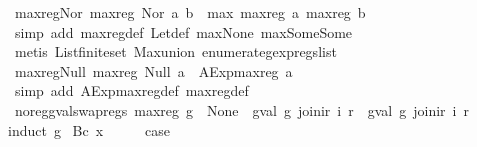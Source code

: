 \begin{isabellebody}
\isanewline
%
\endisadelimproof
\isanewline
{}\isamarkupfalse%
\ max{\isacharunderscore}reg{\isacharunderscore}Nor{\isacharcolon}\ {\isachardoublequoteopen}max{\isacharunderscore}reg\ {\isacharparenleft}Nor\ a\ b{\isacharparenright}\ {\isacharequal}\ max\ {\isacharparenleft}max{\isacharunderscore}reg\ a{\isacharparenright}\ {\isacharparenleft}max{\isacharunderscore}reg\ b{\isacharparenright}{\isachardoublequoteclose}\isanewline
%
\isadelimproof
\ \ %
\endisadelimproof
%
\isatagproof
{}\isamarkupfalse%
\ {\isacharparenleft}simp\ add{\isacharcolon}\ max{\isacharunderscore}reg{\isacharunderscore}def\ Let{\isacharunderscore}def\ max{\isacharunderscore}None\ max{\isacharunderscore}Some{\isacharunderscore}Some{\isacharparenright}\isanewline
\ \ \isamarkupfalse%
\ {\isacharparenleft}metis\ List{\isachardot}finite{\isacharunderscore}set\ Max{\isachardot}union\ enumerate{\isacharunderscore}gexp{\isacharunderscore}regs{\isacharunderscore}list{\isacharparenright}%
\endisatagproof
{\isafoldproof}%
%
\isadelimproof
\isanewline
%
\endisadelimproof
\isanewline
{}\isamarkupfalse%
\ max{\isacharunderscore}reg{\isacharunderscore}Null{\isacharcolon}\ {\isachardoublequoteopen}max{\isacharunderscore}reg\ {\isacharparenleft}Null\ a{\isacharparenright}\ {\isacharequal}\ AExp{\isachardot}max{\isacharunderscore}reg\ a{\isachardoublequoteclose}\isanewline
%
\isadelimproof
\ \ %
\endisadelimproof
%
\isatagproof
{}\isamarkupfalse%
\ {\isacharparenleft}simp\ add{\isacharcolon}\ AExp{\isachardot}max{\isacharunderscore}reg{\isacharunderscore}def\ max{\isacharunderscore}reg{\isacharunderscore}def{\isacharparenright}%
\endisatagproof
{\isafoldproof}%
%
\isadelimproof
\isanewline
%
\endisadelimproof
\isanewline
{}\isamarkupfalse%
\ no{\isacharunderscore}reg{\isacharunderscore}gval{\isacharunderscore}swap{\isacharunderscore}regs{\isacharcolon}\ {\isachardoublequoteopen}max{\isacharunderscore}reg\ g\ {\isacharequal}\ None\ {\isasymLongrightarrow}\ gval\ g\ {\isacharparenleft}join{\isacharunderscore}ir\ i\ r{\isacharparenright}\ {\isacharequal}\ gval\ g\ {\isacharparenleft}join{\isacharunderscore}ir\ i\ r{\isacharprime}{\isacharparenright}{\isachardoublequoteclose}\isanewline
%
\isadelimproof
%
\endisadelimproof
%
\isatagproof
{}\isamarkupfalse%
{\isacharparenleft}induct\ g{\isacharparenright}\isanewline
{}\isamarkupfalse%
\ {\isacharparenleft}Bc\ x{\isacharparenright}\isanewline
\ \ \isamarkupfalse%
\ \isamarkupfalse%
\ {\isacharquery}case\isanewline

\end{isabellebody}
